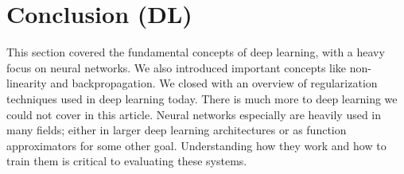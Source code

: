\section{Conclusion (DL)}
\begin{flushleft}
    \large This section covered the fundamental concepts of deep learning, with a heavy focus on neural networks. We also introduced important concepts like non-linearity and backpropagation. We closed with an overview of regularization techniques used in deep learning today. There is much more to deep learning we could not cover in this article. Neural networks especially are heavily used in many fields; either in larger deep learning architectures or as function approximators for some other goal. Understanding how they work and how to train them is critical to evaluating these systems. \break
\end{flushleft}
